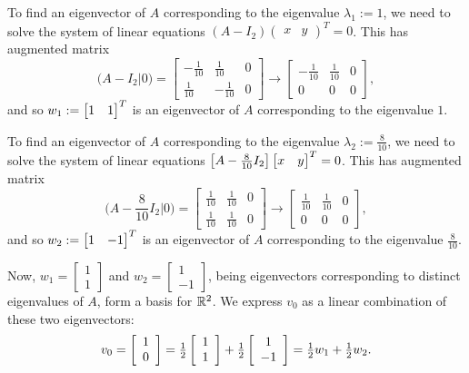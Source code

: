 \documentclass[a4paper]{amsart}
\renewenvironment{solution}{\SolutionInline}{\endSolutionInline}
\begin{document}
\begin{solution}
 To find an eigenvector of $A$ corresponding to the eigenvalue $\lambda_1 :=1$,
 we need to solve the system of linear equations
 $(A - I_2)(\begin{array}{cc} x & y \end{array})^T = 0$. This has augmented matrix
 $$
 \big(A - I_2|0\big) = \left[\begin{array}{cc|c}
 - \frac{1}{10} & \frac{1}{10} & 0\\[3pt]
 \frac{1}{10}
 &- \frac{1}{10} & 0\end{array} \right] \to
  \left[\begin{array}{cc|c}- \frac{1}{10} & \frac{1}{10} & 0\\[2pt]
 0
 & 0 & 0\end{array} \right],
 $$
 and so $w_1 :=\left[\begin{matrix} 1 & 1\end{matrix}\right]^T$ is an eigenvector of $A$ corresponding to
 the eigenvalue $1$.

 To find an eigenvector of $A$ corresponding to the eigenvalue
 $\lambda_2 := \frac{8}{10}$, we need to solve the system of linear
 equations
 $\left[A -{\textstyle \frac{8}{10}} I_2\right]\left[\begin{matrix} x & y \end{matrix}\right]^T = 0$. This has
 augmented matrix
 $$
 \big(A -{\textstyle \frac{8}{10}} I_2|0\big) =
 \left[\begin{array}{cc|c} \frac{1}{10} & \frac{1}{10} & 0\\[3pt]
 \frac{1}{10}
 & \frac{1}{10} & 0\end{array} \right] \to
  \left[\begin{array}{cc|c} \frac{1}{10} & \frac{1}{10} & 0\\[2pt]
 0
 & 0 & 0\end{array} \right],
 $$
 and so $w_2 :=\left[\begin{matrix} 1 & -1\end{matrix}\right]^T$ is an eigenvector of $A$ corresponding to
 the eigenvalue $\frac{8}{10}$.

 Now, $w_1 = \left[\begin{array}{c} 1 \\ 1 \end{array}\right]$
 and $w_2 = \left[\begin{array}{c} 1 \\ -1 \end{array}\right]$, being
 eigenvectors corresponding to distinct eigenvalues of $A$, form a
 basis for ${\mathbb{R}}^2$. We express $v_0$ as a linear combination of these
 two eigenvectors:
 $$
 v_0 =\left[\begin{array}{cc} 1\\ 0 \end{array}\right] = {\textstyle
 \tfrac{1}{2}}\left[\begin{array}{c} 1 \\ 1 \end{array}\right] +
 {\textstyle \tfrac{1}{2}}\left[\begin{array}{c} 1 \\ -1
 \end{array}\right] = {\textstyle \tfrac{1}{2} w_1 + \tfrac{1}{2} w_2}.
 $$


\end{solution}
\end{document}
